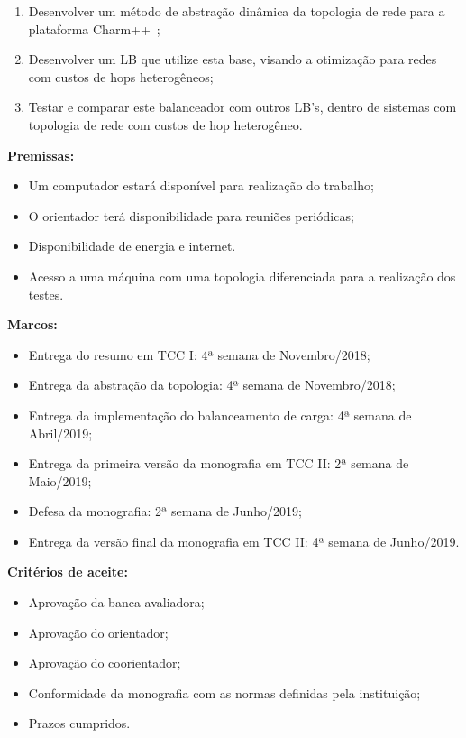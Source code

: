 \documentclass[
	12pt,				%
	openright,			%
	twoside,			%
	a4paper,			%
	english,			%
	brazil,				%
	]{abntex2}
\begin{document}
\begin{enumerate}
\item Desenvolver um método de abstração dinâmica da topologia de rede para a plataforma Charm++~\cite{website:CHARM};
\item  Desenvolver um LB que utilize esta base, visando a otimização para redes com custos de hops heterogêneos;
\item Testar e comparar este balanceador com outros LB's, dentro de sistemas com topologia de rede com custos de hop heterogêneo.
\end{enumerate}

\begin{flushleft}
\textbf{Premissas:}
\begin{itemize}
\item Um computador estará disponível para realização do trabalho; 
\item O orientador terá disponibilidade para reuniões periódicas;
\item Disponibilidade de energia e internet.
\item Acesso a uma máquina com uma topologia diferenciada para a realização dos testes.
\end{itemize}

\textbf{Marcos:}
\begin{itemize}
 
\item Entrega do resumo em TCC I: 4ª semana de Novembro/2018; 
\item Entrega da abstração da topologia: 4ª semana de Novembro/2018;
\item Entrega da implementação do balanceamento de carga: 4ª semana de Abril/2019;
\item Entrega da primeira versão da monografia em TCC II: 2ª semana de Maio/2019; 
\item Defesa da monografia: 2ª semana de Junho/2019;
\item Entrega da versão final da monografia em TCC II: 4ª semana de Junho/2019.
\end{itemize}

\textbf{Critérios de aceite:}
\begin{itemize}
\item Aprovação da banca avaliadora;
\item Aprovação do orientador;
\item Aprovação do coorientador;
\item Conformidade da monografia com as normas definidas pela instituição;
\item Prazos cumpridos.
\end{itemize}
\end{flushleft}
\end{document}
